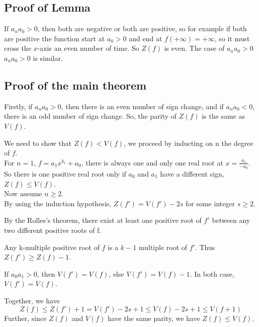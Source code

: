 \documentclass[a4paper,12pt]{article}
\begin{document}
\subsection*{Proof of Lemma}
If \(a_n a_0 > 0\), then both are negative or both are positive, so for example if both 
are positive the function start at \(a_0 >0\) and end at \(f(+\infty)=+\infty\), so it must
cross the \(x\)-axis an even number of time. So \( Z(f) \) is even. The case of \(a_n a_0 > 0\)\(a_n a_0 > 0\) is similar.

\subsection*{Proof of the main theorem}

Firstly, if \(a_n a_0 >0\), then there is an even number of sign change, and if \(a_n a_0<0\), there is an odd number of sign change.
So, the parity of \(Z(f)\) is the same as \(V(f)\).

We need to show that \(Z(f) < V(f)\), we proceed by inducting on n the degree of \(f\).
\\

For \(n=1\), \(f=a_1x^{b_1}+a_0\), there is always one and only one real root at 
\(x=\frac{a_1}{-a_0}\). So there is one positive real root only if \(a_0\) and \(a_1\) have a different sign, \(Z(f) \leq V(f)\).
\\

Now assume \(n \geq 2\).
\\

By using the induction hypothesis, \(Z(f') = V(f') - 2s\) for some integer \(s \geq 2\).

By the Rolles's theorem, there exist at least one positive root of \(f'\) between any two different positive roots of f.

Any k-multiple positive root of \(f\) is a \(k-1\) multiple root of \(f'\). Thus \(Z(f') \geq Z(f)-1\).

If \(a_0 a_1 > 0\), then \(V(f')=V(f)\), else \(V(f')=V(f)-1\). In both case, \(V(f')=V(f)\).

Together, we have
\[Z(f) \leq Z(f')+1 = V(f') -2s +1 \leq V(f) -2s+1 \leq V(f+1)\]
Further, since \(Z(f)\) and \(V(f)\) have the same parity, we have \(Z(f) \leq V(f)\).
\end{document}
